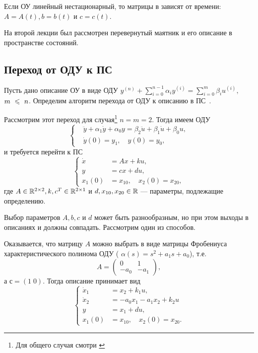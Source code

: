 \documentclass[../../TAU.tex]{subfiles}
\begin{document}
    Если ОУ линейный нестационарный, то матрицы в  зависят от времени: $A=A(t), b=b(t)$ и $c=c(t)$.

    На второй лекции был рассмотрен перевернутый маятник и его описание в пространстве состояний.

\subsection{Переход от ОДУ к ПС}

    Пусть дано описание ОУ в виде ОДУ  {}
    $y^{(n)}+\sum_{i=0}^{n-1}\alpha_iy^{(i)}=\sum_{i=0}^{m}\beta_iu^{(i)},\;$ $m~\leqslant~n$. 
    Определим алгоритм перехода от ОДУ к описанию в ПС~.

    Рассмотрим этот переход для случая\footnote{Для общего случая смотри \cite{pandia}} $n=m=2$. Тогда имеем ОДУ
    \begin{equation}\label{ODU_2}
        \left\{
        \begin{aligned}
            &\ddot y + \alpha_1 \dot y + \alpha_0 y = \beta_2 \ddot{u} + \beta_1 \dot u + \beta_0 u,\\
            &\dot y(0) = y_1,\quad y(0) = y_0,
        \end{aligned}\right.
    \end{equation}
        и требуется перейти к ПС
    \begin{equation}\label{STDS_2}
        \left\{
        \begin{aligned}
            \dot x &= Ax + ku,\\
            y &= cx + du,\\
            x_1(0) &= x_{10},\quad x_2(0) = x_{20},
        \end{aligned}
        \right.
    \end{equation}
    где 
    $A\in\mathbb{R}^{2\times2}, k, c^T\in\mathbb{R}^{2\times1}$ 
    и 
    $d,x_{10}, x_{20}\in\mathbb{R}$ --- 
    параметры, подлежащие определению.

    Выбор параметров $A,b,c$ и $d$ может быть разнообразным, но при этом выходы в описаниях  и  должны совпадать. Рассмотрим один из способов.

    Оказывается, что матрицу $A$ можно выбрать в виде матрицы Фробениуса характеристического полинома ОДУ  (
    $\alpha(s) = s^2+a_1s+a_0$), 
    т.е.
    $$
        A =
        \begin{pmatrix}
            0&    1\\
            -a_0& -a_1
        \end{pmatrix},
    $$
    а $с = (1\; 0)$. Тогда описание  принимает вид
    \begin{equation}\label{EQ1}
        \left\{
        \begin{aligned}
            \dot x_1 &= x_2 + k_1 u,\\
            \dot x_2 &= -a_0x_1-a_1x_2+k_2u\\
            y &= x_1 + du,\\
            x_1(0) &= x_{10},\quad x_2(0) = x_{20}.
        \end{aligned}
        \right.
    \end{equation}
\end{document}
